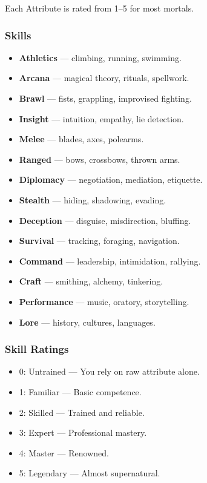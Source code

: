 \documentclass[11pt]{article}
\begin{document}
Each Attribute is rated from 1–5 for most mortals.

\subsubsection{Skills}
\begin{itemize}
    \item \textbf{Athletics} — climbing, running, swimming.
    \item \textbf{Arcana} — magical theory, rituals, spellwork.
    \item \textbf{Brawl} — fists, grappling, improvised fighting.
    \item \textbf{Insight} — intuition, empathy, lie detection.
    \item \textbf{Melee} — blades, axes, polearms.
    \item \textbf{Ranged} — bows, crossbows, thrown arms.
    \item \textbf{Diplomacy} — negotiation, mediation, etiquette.
    \item \textbf{Stealth} — hiding, shadowing, evading.
    \item \textbf{Deception} — disguise, misdirection, bluffing.
    \item \textbf{Survival} — tracking, foraging, navigation.
    \item \textbf{Command} — leadership, intimidation, rallying.
    \item \textbf{Craft} — smithing, alchemy, tinkering.
    \item \textbf{Performance} — music, oratory, storytelling.
    \item \textbf{Lore} — history, cultures, languages.
\end{itemize}

\subsubsection{Skill Ratings}
\begin{itemize}
    \item 0: Untrained — You rely on raw attribute alone.
    \item 1: Familiar — Basic competence.
    \item 2: Skilled — Trained and reliable.
    \item 3: Expert — Professional mastery.
    \item 4: Master — Renowned.
    \item 5: Legendary — Almost supernatural.
\end{itemize}
\end{document}
